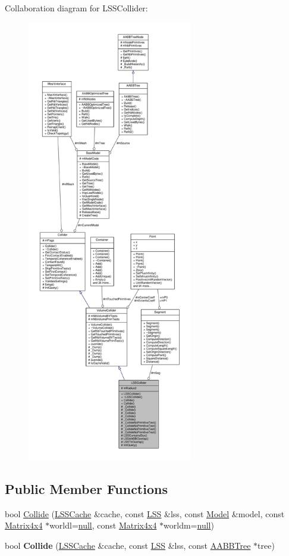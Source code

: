 Collaboration diagram for L\+S\+S\+Collider\+:
\nopagebreak
\begin{figure}[H]
\begin{center}
\leavevmode
\includegraphics[height=550pt]{d2/d83/classLSSCollider__coll__graph}
\end{center}
\end{figure}
\subsection*{Public Member Functions}
\begin{DoxyCompactItemize}
\item 
bool \hyperlink{classLSSCollider_a4c4ff9f48a8b7b2b01b71beea04ee261}{Collide} (\hyperlink{structLSSCache}{L\+S\+S\+Cache} \&cache, const \hyperlink{classLSS}{L\+SS} \&lss, const \hyperlink{classModel}{Model} \&model, const \hyperlink{classMatrix4x4}{Matrix4x4} $\ast$worldl=\hyperlink{IceTypes_8h_ac97b8ee753e4405397a42ad5799b0f9e}{null}, const \hyperlink{classMatrix4x4}{Matrix4x4} $\ast$worldm=\hyperlink{IceTypes_8h_ac97b8ee753e4405397a42ad5799b0f9e}{null})
\item 
bool {\bfseries Collide} (\hyperlink{structLSSCache}{L\+S\+S\+Cache} \&cache, const \hyperlink{classLSS}{L\+SS} \&lss, const \hyperlink{classAABBTree}{A\+A\+B\+B\+Tree} $\ast$tree)\hypertarget{classLSSCollider_a3e68e9b2ecdbed62116fec0b3ec8d4cd}{}\label{classLSSCollider_a3e68e9b2ecdbed62116fec0b3ec8d4cd}

\end{DoxyCompactItemize}
